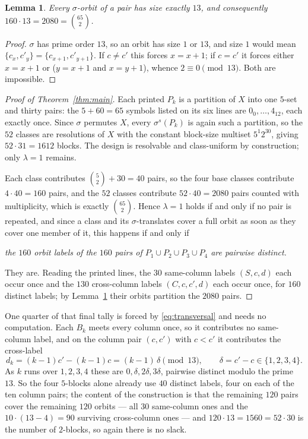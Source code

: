 \documentclass[11pt]{amsart}
\newtheorem{lemma}[theorem]{Lemma}
\theoremstyle{remark}
\begin{document}
\begin{lemma}\label{lem:orbits}
Every $\sigma$-orbit of a pair has size exactly $13$, and consequently
$160\cdot13=2080=\binom{65}2$.
\end{lemma}

\begin{proof}
$\sigma$ has prime order $13$, so an orbit has size $1$ or $13$, and size $1$
would mean $\{c_x,c'_y\}=\{c_{x+1},c'_{y+1}\}$. If $c\ne c'$ this forces
$x=x+1$; if $c=c'$ it forces either $x=x+1$ or ($y=x+1$ and $x=y+1$), whence
$2\equiv0\pmod{13}$. Both are impossible.
\end{proof}

\begin{proof}[Proof of Theorem~\ref{thm:main}]
Each printed $P_k$ is a partition of $X$ into one $5$-set and thirty pairs: the
$5+60=65$ symbols listed on its six lines are $0_0,\dots,4_{12}$, each exactly
once. Since $\sigma$ permutes $X$, every $\sigma^s(P_k)$ is again such a
partition, so the $52$ classes are resolutions of $X$ with the constant
block-size multiset $5^1 2^{30}$, giving $52\cdot31=1612$ blocks. The design is
resolvable and class-uniform by construction; only $\lambda=1$ remains.

Each class contributes $\binom52+30=40$ pairs, so the four base classes
contribute $4\cdot40=160$ pairs, and the $52$ classes contribute
$52\cdot40=2080$ pairs counted with multiplicity, which is exactly
$\binom{65}2$. Hence $\lambda=1$ holds if and only if no pair is repeated, and
since a class and its $\sigma$-translates cover a full orbit as soon as they
cover one member of it, this happens if and only if
\begin{center}
\emph{the $160$ orbit labels of the $160$ pairs of $P_1\cup P_2\cup P_3\cup P_4$
are pairwise distinct.}
\end{center}
They are. Reading the printed lines, the $30$ same-column labels $(S,c,d)$ each
occur once and the $130$ cross-column labels $(C,c,c',d)$ each occur once, for
$160$ distinct labels; by Lemma~\ref{lem:orbits} their orbits partition the
$2080$ pairs.
\end{proof}

One quarter of that final tally is forced by \eqref{eq:transversal} and needs no
computation. Each $B_k$ meets every column once, so it contributes no
same-column label, and on the column pair $(c,c')$ with $c<c'$ it contributes
the cross-label
\[
 d_k=(k-1)c'-(k-1)c=(k-1)\,\delta \pmod{13},\qquad \delta=c'-c\in\{1,2,3,4\}.
\]
As $k$ runs over $1,2,3,4$ these are $0,\delta,2\delta,3\delta$, pairwise
distinct modulo the prime $13$. So the four $5$-blocks alone already use $40$
distinct labels, four on each of the ten column pairs; the content of the
construction is that the remaining $120$ pairs cover the remaining $120$ orbits
--- all $30$ same-column ones and the $10\cdot(13-4)=90$ surviving cross-column
ones --- and $120\cdot13=1560=52\cdot30$ is the number of $2$-blocks, so again
there is no slack.
\end{document}
